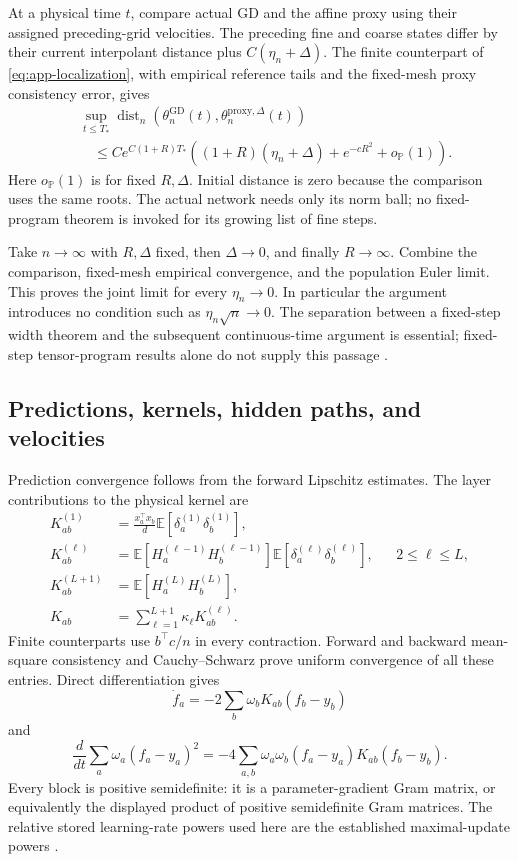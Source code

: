 At a physical time $t$, compare actual GD and the affine proxy using
their assigned preceding-grid velocities.  The preceding fine and
coarse states differ by their current interpolant distance plus
$C(\eta_n+\Delta)$.  The finite counterpart of
\eqref{eq:app-localization}, with empirical reference tails and the
fixed-mesh proxy consistency error, gives
\begin{align*}
 &\sup_{t\le T_*}
 \operatorname{dist}_n(
       \theta_n^{\mathrm{GD}}(t),\theta_n^{\mathrm{proxy},\Delta}(t))\\
 &\quad\le Ce^{C(1+R)T_*}
 \left((1+R)(\eta_n+\Delta)+e^{-cR^2}+o_{\mathbb P}(1)\right).
\end{align*}
Here $o_{\mathbb P}(1)$ is for fixed $R,\Delta$.  Initial distance is
zero because the comparison uses the same roots.  The actual network
needs only its norm ball; no fixed-program theorem is invoked for its
growing list of fine steps.

Take $n\to\infty$ with $R,\Delta$ fixed, then $\Delta\to0$, and finally
$R\to\infty$.  Combine the comparison, fixed-mesh empirical convergence,
and the population Euler limit.  This proves the joint limit for every
$\eta_n\to0$.  In particular the argument introduces no condition such
as $\eta_n\sqrt n\to0$.  The separation between a fixed-step width
theorem and the subsequent continuous-time argument is essential;
fixed-step tensor-program results alone do not supply this passage
\cite{TP4,TP4b}.

\subsection{Predictions, kernels, hidden paths, and velocities}
\label{app:observables}

Prediction convergence follows from the forward Lipschitz estimates.
The layer contributions to the physical kernel are
\begin{align*}
 K_{ab}^{(1)}
 &=\frac{x_a^\top x_b}{d}
       \mathbb E[\delta_a^{(1)}\delta_b^{(1)}],\\
 K_{ab}^{(\ell)}
 &=\mathbb E[H_a^{(\ell-1)}H_b^{(\ell-1)}]
   \mathbb E[\delta_a^{(\ell)}\delta_b^{(\ell)}],
       &&2\le\ell\le L,\\
 K_{ab}^{(L+1)}
 &=\mathbb E[H_a^{(L)}H_b^{(L)}],\\
 K_{ab}&=\sum_{\ell=1}^{L+1}\kappa_\ell K_{ab}^{(\ell)}.
\end{align*}
Finite counterparts use $b^\top c/n$ in every contraction.  Forward
and backward mean-square consistency and Cauchy--Schwarz prove uniform
convergence of all these entries.  Direct differentiation gives
\[
 \dot f_a=-2\sum_b\omega_bK_{ab}(f_b-y_b)
\]
and
\[
 \frac{d}{dt}\sum_a\omega_a(f_a-y_a)^2
 =-4\sum_{a,b}\omega_a\omega_b
           (f_a-y_a)K_{ab}(f_b-y_b).
\]
Every block is positive semidefinite: it is a parameter-gradient Gram
matrix, or equivalently the displayed product of positive semidefinite
Gram matrices.  The relative stored learning-rate powers used here are
the established maximal-update powers \cite{TP5}.

